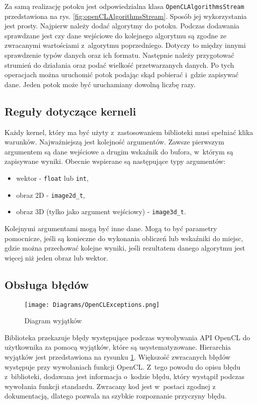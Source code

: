 Za samą realizację potoku jest odpowiedzialna klasa \texttt{OpenCLAlgorithmsStream} przedstawiona na rys. \ref{fig:openCLAlgorithmsStream}. Sposób jej wykorzystania jest prosty. Najpierw należy dodać algorytmy do potoku. Podczas dodawania sprawdzane jest czy dane wejściowe do kolejnego algorytmu są zgodne ze zwracanymi wartościami z~algorytmu poprzedniego. Dotyczy to między innymi sprawdzenie typów danych oraz ich formatu. Następnie należy przygotować strumień do działania oraz podać wielkość przetwarzanych danych. Po tych operacjach można uruchomić potok podając skąd pobierać i~gdzie zapisywać dane. Jeden potok może być uruchamiany dowolną liczbę razy.

\subsection{Reguły dotyczące kerneli}
\label{subsec:regulykerneli}

Każdy kernel, który ma być użyty z~zastosowaniem biblioteki musi spełniać klika warunków. Najważniejszą jest kolejność argumentów. Zawsze pierwszym argumentem są dane wejściowe a drugim wskaźnik do bufora, w~którym są zapisywane wyniki. Obecnie wspierane są następujące typy argumentów:
\begin{itemize}
\item wektor - \texttt{float\*} lub \texttt{int\*},
\item obraz 2D - \texttt{image2d\_t},
\item obraz 3D (tylko jako argument wejściowy) - \texttt{image3d\_t}.
\end{itemize}
Kolejnymi argumentami mogą być inne dane. Mogą to być parametry pomocnicze, jeśli są konieczne do wykonania obliczeń lub wskaźniki do miejsc, gdzie można przechować kolejne wyniki, jeśli rezultatem danego algorytmu jest więcej niż jeden obraz lub wektor.

\subsection{Obsługa błędów}
\label{subsec:obslugabledow}


\begin{figure}
\begin{center}
\texttt{[image: Diagrams/OpenCLExceptions.png]}
\end{center}
\caption{Diagram wyjątków}
\label{fig:diagramwyjatkow}
\end{figure}

Biblioteka przekazuje błędy występujące podczas wywoływania API OpenCL do użytkownika za pomocą wyjątków, które są usystematyzowane. Hierarchia wyjątków jest przedstawiona na rysunku \ref{fig:diagramwyjatkow}. Większość zwracanych błędów występuje przy wywołaniach funkcji OpenCL. Z~tego powodu do opisu błędu z~biblioteki, dodawana jest informacja o~kodzie błędu, który wystąpił podczas wywołania funkcji standardu. Zwracany kod jest w~postaci zgodnej z dokumentacją, dlatego pozwala na szybkie rozpoznanie przyczyny błędu.

